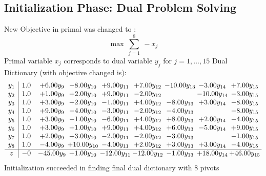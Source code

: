 \documentclass[9pt]{article}
\begin{document}
\subsection{Initialization Phase: Dual Problem Solving}
New Objective in primal was changed to : \[ \max\ \sum_{j=1}^{8}\ - x_j \] 
Primal variable $x_j$ corresponds to dual variable $y_j$ for $j = 1,\ldots,15$
Dual Dictionary (with objective changed is): 
\[\begin{array}{c| c c@{\hskip 2pt} c@{\hskip 2pt} c@{\hskip 2pt} c@{\hskip 2pt} c@{\hskip 2pt} c@{\hskip 2pt} c@{\hskip 2pt} }
 y_{1}   &  1.0 & +  6.00 y_{9} & -8.00 y_{10} & +  9.00 y_{11} & +  7.00 y_{12} & -10.00 y_{13} & -3.00 y_{14} & +  7.00 y_{15}\\
 y_{2}   &  1.0 & +  1.00 y_{9} & +  2.00 y_{10} & +  9.00 y_{11} & -2.00 y_{12} &   & -10.00 y_{14} & -3.00 y_{15}\\
 y_{3}   &  1.0 & +  3.00 y_{9} & +  2.00 y_{10} & -1.00 y_{11} & +  4.00 y_{12} & -8.00 y_{13} & +  3.00 y_{14} & -8.00 y_{15}\\
 y_{4}   &  1.0 & +  9.00 y_{9} & -4.00 y_{10} & -3.00 y_{11} & -2.00 y_{12} & -4.00 y_{13} &   & -8.00 y_{15}\\
 y_{5}   &  1.0 & +  3.00 y_{9} & -1.00 y_{10} & -6.00 y_{11} & +  4.00 y_{12} & +  8.00 y_{13} & +  2.00 y_{14} & -4.00 y_{15}\\
 y_{6}   &  1.0 & +  3.00 y_{9} & +  1.00 y_{10} & +  9.00 y_{11} & +  4.00 y_{12} & +  6.00 y_{13} & -5.00 y_{14} & +  9.00 y_{15}\\
 y_{7}   &  1.0 & +  2.00 y_{9} & +  3.00 y_{10} & -2.00 y_{11} & -2.00 y_{12} & -3.00 y_{13} &   & -1.00 y_{15}\\
 y_{8}   &  1.0 & -4.00 y_{9} & + 10.00 y_{10} & -4.00 y_{11} & +  2.00 y_{12} & +  3.00 y_{13} & +  3.00 y_{14} & -4.00 y_{15}\\
\hline
z    &  -0 & -45.00 y_{9} & +  1.00 y_{10} & -12.00 y_{11} & -12.00 y_{12} & -1.00 y_{13} & + 18.00 y_{14} & + 46.00 y_{15}\\
\end{array}\]
Initialization succeeded in finding final dual dictionary with 8 pivots
\end{document}
